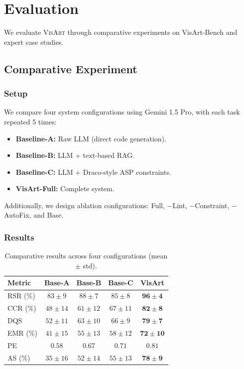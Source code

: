 \documentclass[final,5p,times,twocolumn]{elsarticle}
\newcommand{\sysname}{\textsc{VisArt}}
\begin{document}
\section{Evaluation}
\label{sec:eval}

We evaluate \sysname{} through comparative experiments on VisArt-Bench and expert case studies.

\subsection{Comparative Experiment}

\subsubsection{Setup}

We compare four system configurations using Gemini 1.5 Pro, with each task repeated 5 times:

\begin{itemize}
  \item \textbf{Baseline-A:} Raw LLM (direct code generation).
  \item \textbf{Baseline-B:} LLM + text-based RAG.
  \item \textbf{Baseline-C:} LLM + Draco-style ASP constraints.
  \item \textbf{VisArt-Full:} Complete system.
\end{itemize}

Additionally, we design ablation configurations: Full, $-$Lint, $-$Constraint, $-$AutoFix, and Base.

\subsubsection{Results}

\begin{table}[!t]
\centering
\caption{Comparative results across four configurations (mean $\pm$ std).}
\label{tab:results}
\small
\begin{tabular}{@{}lcccc@{}}
\toprule
\textbf{Metric} & \textbf{Base-A} & \textbf{Base-B} & \textbf{Base-C} & \textbf{VisArt} \\
\midrule
RSR (\%) & $83\pm9$  & $88\pm7$  & $85\pm8$  & $\mathbf{96\pm4}$ \\
CCR (\%) & $48\pm14$ & $61\pm12$ & $67\pm11$ & $\mathbf{82\pm8}$ \\
DQS      & $52\pm11$ & $63\pm10$ & $66\pm9$  & $\mathbf{79\pm7}$ \\
EMR (\%) & $41\pm15$ & $55\pm13$ & $58\pm12$ & $\mathbf{72\pm10}$ \\
PE       & $0.58$    & $0.67$    & $0.71$    & $\mathbf{0.81}$ \\
AS (\%)  & $35\pm16$ & $52\pm14$ & $55\pm13$ & $\mathbf{78\pm9}$ \\
\bottomrule
\end{tabular}
\end{table}
\end{document}
